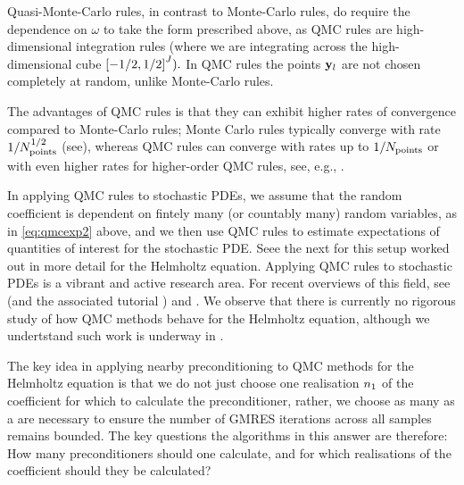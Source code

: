 Quasi-Monte-Carlo rules, in contrast to Monte-Carlo rules, do require the dependence on $\omega$ to take the form prescribed above, as QMC rules are high-dimensional integration rules (where we are integrating across the high-dimensional cube $\cube{J}).$ In QMC rules the points $\mathbf{y}_{l}$ are not chosen completely at random, unlike Monte-Carlo rules.

The advantages of QMC rules is that they can exhibit higher rates of convergence compared to Monte-Carlo rules; Monte Carlo rules typically converge with rate $1/N_{\mathrm{points}}^{1/2}$ (see), whereas QMC rules can converge with rates up to $1/N_{\mathrm{points}}$  or with even higher rates for higher-order QMC rules, see, e.g., \cite[Penultimate paragraph of Section 1.2]{KuNu:16}.

In applying QMC rules to stochastic PDEs, we assume that the random coefficient is dependent on fintely many (or countably many) random variables, as in \cref{eq:qmcexp2} above, and we then use QMC rules to estimate expectations of quantities of interest for the stochastic PDE. Seee the next  for this setup worked out in more detail for the Helmholtz equation. Applying QMC rules to stochastic PDEs is a vibrant and active research area. For recent overviews of this field, see \cite{KuNu:16} (and the associated tutorial \cite{KuNU:18a}) and \cite{KuNu:18b}. We observe that there is currently no rigorous study of how QMC methods behave for the Helmholtz equation, although we undertstand such work is underway in \cite{GaKuSl}.

The key idea in applying nearby preconditioning to QMC methods for the Helmholtz equation is that we do not just choose one realisation $n_{1}$ of the coefficient for which to calculate the preconditioner, rather, we choose as many as a are necessary to ensure the number of GMRES iterations across all samples remains bounded. The key questions the algorithms in this  answer are therefore: How many preconditioners should one calculate, and for which realisations of the coefficient should they be calculated?

